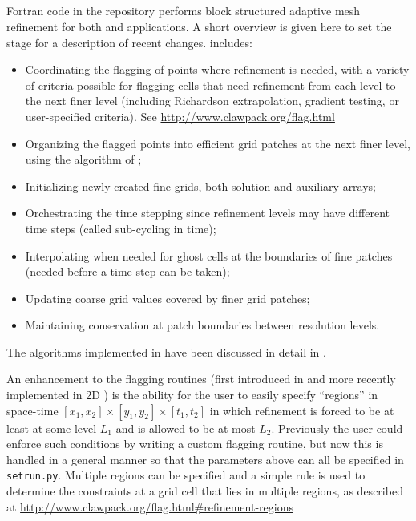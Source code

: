 %
%
%

\subsection{\amrclaw}
Fortran code in the \amrclaw repository performs block structured adaptive mesh
refinement \cite{BO,BC} for both 
\clawpack and \geoclaw  applications.
A short overview is given
here to set the stage for a description of recent changes.
\amrclaw includes: 
\begin{itemize}
\item
Coordinating the flagging of points where refinement is needed,
with a variety of criteria possible for flagging cells that need refinement
from each level to the next finer level (including Richardson extrapolation,
gradient testing, or user-specified criteria).  See
\url{http://www.clawpack.org/flag.html}
\item
Organizing the flagged points into efficient grid
patches at the next finer level, using the algorithm of
\cite{mjb-rig:cluster};
\item
Initializing newly created fine grids, both solution and
auxiliary arrays;
\item
Orchestrating the time stepping since refinement levels may have
different time steps ({called sub-cycling in time});
\item
Interpolating when needed for ghost cells at the boundaries of fine patches \\
({needed before a time step can be taken});
\item
Updating coarse grid values covered by finer grid patches;
\item
Maintaining conservation at patch boundaries between resolution levels.\\
\end{itemize}

The algorithms implemented in \amrclaw have been discussed in detail in
\cite{mjb-rjl:amrclaw,LeVequeGeorgeBerger:an11}. 

An enhancement to the flagging routines (first introduced in
\geoclaw and more recently implemented in 2D \amrclaw) 
is the ability for the user to easily specify ``regions'' in space-time
$[x_1,x_2] \times [y_1,y_2] \times [t_1,t_2]$ in which refinement is forced to
be at least at some level $L_1$ and is allowed to be at most $L_2$.
Previously the user could enforce such conditions by writing a custom
flagging routine, but now this is handled in a general manner so that the
parameters above can all be specified in \texttt{setrun.py}.  Multiple
regions can be specified and a simple rule is used to determine the
constraints at a grid cell that lies in multiple regions, as described at
\url{http://www.clawpack.org/flag.html#refinement-regions}

